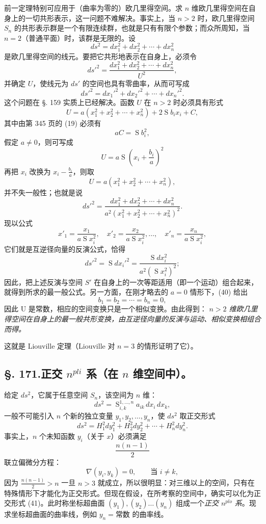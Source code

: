 前一定理特别可应用于（曲率为零的）欧几里得空间。求 \(n\) 维欧几里得空间在自身上的一切共形表示，这一问题不难解决。事实上，当 \(n>2\) 时，欧几里得空间 \(S_n\) 的共形表示群是一个有限连续群，也就是只有有限个参数；而众所周知，当 \(n=2\)（普通平面）时，该群是无限的。设
\[
 ds^2=dx_1^2+dx_2^2+\cdots+dx_n^2
\]
是欧几里得空间的线元。要把它共形地表示在自身上，必须令
\[
 ds'^2=\frac{dx_1^2+dx_2^2+\cdots+dx_n^2}{U^2},
\]
并确定 \(U\)，使线元为 \(ds'\) 的空间也具有零曲率，从而可写成
\[
 ds'^2=dx_1'^2+dx_2'^2+\cdots+dx_n'^2.
\]
这个问题在 \S. 159 实质上已经解决。函数 \(U\) 在 \(n>2\) 时必须具有形式
\[
 U=a(x_1^2+x_2^2+\cdots+x_n^2)+2\mathop{\mathrm{S}} b_i x_i+C,
\]
其中由第 345 页的 (19) 必须有
\[
\tag{40}
 aC=\mathop{\mathrm{S}}b_i^2,
\]
假定 \(a\ne0\)，则可写成
\[
 U=a\mathop{\mathrm{S}}\left(x_i+\frac{b_i}{a}\right)^2
\]
再把 \(x_i\) 改换为 \(x_i-\frac{b_i}{a}\)，则取
\[
 U=a(x_1^2+x_2^2+\cdots+x_n^2),
\]
并不失一般性；也就是说
\[
 ds'^2=\frac{dx_1^2+dx_2^2+\cdots+dx_n^2}{a^2(x_1^2+x_2^2+\cdots+x_n^2)^2}.
\]
现以公式
\[
 x'_1=\frac{x_1}{a\mathop{\mathrm{S}}x_i^2},\quad
 x'_2=\frac{x_2}{a\mathop{\mathrm{S}}x_i^2},\ldots,\quad
 x'_n=\frac{x_n}{a\mathop{\mathrm{S}}x_i^2},
\]
它们就是互逆径向量的反演公式，恰得
\[
 ds'^2=\mathop{\mathrm{S}}dx_i'^2=
 \frac{\mathop{\mathrm{S}}dx_i^2}{a^2(\mathop{\mathrm{S}}x_i^2)^2};
\]
因此，把上述反演与空间 \(S'\) 在自身上的一次等距适用（即一个运动）组合起来，就得到所求的最一般公式。另一方面，在刚才略去的 \(a=0\) 情形下，(40) 给出
\[
 b_1=b_2=\cdots=b_n=0,
\]
因此 U 是常数，相应的空间变换只是一个相似变换。由此得到：
\emph{\(n>2\) 维欧几里得空间在自身上的最一般共形变换，由互逆径向量的反演与运动、相似变换相组合而得。}

这就是 Liouville 定理（Liouville 对 \(n=3\) 的情形证明了它）。

\subsection*{\S. 171.\quad 正交 \(n^{pli}\) 系（在 \(n\) 维空间中）。}

给定 \(ds^2\)，它属于任意空间 \(S_n\)，该空间为 \(n\) 维：
\[
 ds^2=\mathop{\mathrm{S}}_{i,k}^{1,\ldots,n} a_{ik}\,dx_i\,dx_k,
\]
一般不可能引入 \(n\) 个新的独立变量 \(y_1,y_2,\ldots,y_n\)，使 \(ds^2\) 取正交形式
\[
\tag{41}
 ds^2=H_1^2dy_1^2+H_2^2dy_2^2+\cdots+H_n^2dy_n^2.
\]
事实上，\(n\) 个未知函数 \(y_i\)（关于 \(x\)）必须满足
\[
 \frac{n(n-1)}2
\]
联立偏微分方程：
\[
 \nabla(y_i,y_k)=0,\qquad \text{当 }i\ne k,
\]
因为 \(\frac{n(n-1)}2>n\) 一旦 \(n>3\) 就成立，所以很明显：对三维以上的空间，只有在特殊情形下才能化为正交形式。但现在假设，在所考察的空间中，确实可以化为正交形式 (41)。此时称坐标超曲面 \((y_1),(y_2)\ldots(y_n)\) 组成一个\emph{正交 \(n^{plo}\) 系}。现求坐标超曲面的曲率线，例如 \(y_n=\text{常数}\) 的曲率线。

